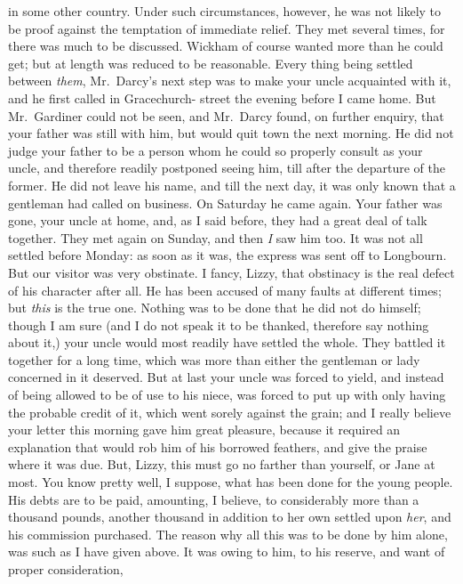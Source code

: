 \begin{letter}
in some other country. Under such circumstances,
however, he was not likely to be proof against the temptation
of immediate relief. They met several times, for
there was much to be discussed. Wickham of course
wanted more than he could get; but at length was
reduced to be reasonable. Every thing being settled
between \textit{them}, Mr.\ Darcy’s next step was to make your
uncle acquainted with it, and he first called in Gracechurch-%
street the evening before I came home. But Mr.\ Gardiner
could not be seen, and Mr.\ Darcy found, on further enquiry,
that your father was still with him, but would quit town
the next morning. He did not judge your father to be
a person whom he could so properly consult as your uncle,
and therefore readily postponed seeing him, till after the
departure of the former. He did not leave his name, and
till the next day, it was only known that a gentleman had
called on business. On Saturday he came again. Your
father was gone, your uncle at home, and, as I said before,
they had a great deal of talk together. They met again on
Sunday, and then \textit{I} saw him too. It was not all settled
before Monday: as soon as it was, the express was sent
off to Longbourn. But our visitor was very obstinate.
I fancy, Lizzy, that obstinacy is the real defect of his
character after all. He has been accused of many faults
at different times; but \textit{this} is the true one. Nothing was
to be done that he did not do himself; though I am
sure (and I do not speak it to be thanked, therefore say
nothing about it,) your uncle would most readily have
settled the whole. They battled it together for a long
time, which was more than either the gentleman or lady
concerned in it deserved. But at last your uncle was
forced to yield, and instead of being allowed to be of use
to his niece, was forced to put up with only having the
probable credit of it, which went sorely against the grain;
and I really believe your letter this morning gave him
great pleasure, because it required an explanation that
would rob him of his borrowed feathers, and give the
praise where it was due. But, Lizzy, this must go no
farther than yourself, or Jane at most. You know pretty
well, I suppose, what has been done for the young people.
His debts are to be paid, amounting, I believe, to considerably
more than a thousand pounds, another thousand in
addition to her own settled upon \textit{her}, and his commission
purchased. The reason why all this was to be done by
him alone, was such as I have given above. It was owing
to him, to his reserve, and want of proper consideration,

\end{letter}
